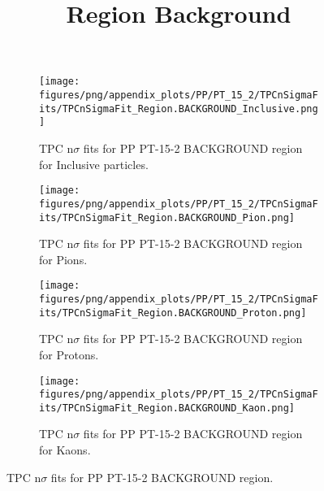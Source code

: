             \begin{figure}[H]
                \title{Region Background}
                \begin{subfigure}[b]{0.5\textwidth}
                    \centering
                    \texttt{[image: figures/png/appendix\_plots/PP/PT\_15\_2/TPCnSigmaFits/TPCnSigmaFit\_Region.BACKGROUND\_Inclusive.png]}
                    \caption{TPC n$\sigma$ fits for PP PT-15-2 BACKGROUND region for Inclusive particles.}
                    \label{fig:appendix_PP_PT-15-2_BACKGROUND_Inclusive}
                \end{subfigure}
                \begin{subfigure}[b]{0.5\textwidth}
                    \centering
                    \texttt{[image: figures/png/appendix\_plots/PP/PT\_15\_2/TPCnSigmaFits/TPCnSigmaFit\_Region.BACKGROUND\_Pion.png]}
                    \caption{TPC n$\sigma$ fits for PP PT-15-2 BACKGROUND region for Pions.}
                    \label{fig:appendix_PP_PT-15-2_BACKGROUND_Pion}
                \end{subfigure}
                \begin{subfigure}[b]{0.5\textwidth}
                    \centering
                    \texttt{[image: figures/png/appendix\_plots/PP/PT\_15\_2/TPCnSigmaFits/TPCnSigmaFit\_Region.BACKGROUND\_Proton.png]}
                    \caption{TPC n$\sigma$ fits for PP PT-15-2 BACKGROUND region for Protons.}
                    \label{fig:appendix_PP_PT-15-2_BACKGROUND_Proton}
                \end{subfigure}
                \begin{subfigure}[b]{0.5\textwidth}
                    \centering
                    \texttt{[image: figures/png/appendix\_plots/PP/PT\_15\_2/TPCnSigmaFits/TPCnSigmaFit\_Region.BACKGROUND\_Kaon.png]}
                    \caption{TPC n$\sigma$ fits for PP PT-15-2 BACKGROUND region for Kaons.}
                    \label{fig:appendix_PP_PT-15-2_BACKGROUND_Kaon}
                \end{subfigure}
                \caption{TPC n$\sigma$ fits for PP PT-15-2 BACKGROUND region.}
                \label{fig:appendix_PP_PT-15-2_BACKGROUND}
            \end{figure}
            \clearpage
            
    
